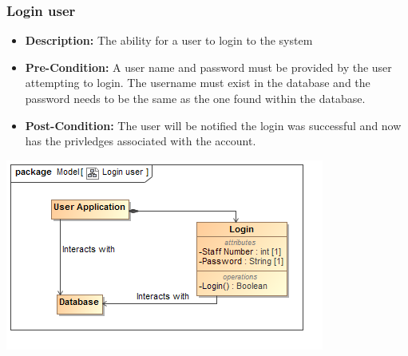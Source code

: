 \documentclass[11pt]{article}
\begin{document}
		\subsubsection{Login user}
		\begin{itemize}
			\item \textbf{Description: }The ability for a user to login to the system
			\item \textbf{Pre-Condition: }A user name and password must be provided by the user attempting to login. The username must exist in the database and the password needs to be the same as the one found within the database. 
			\item \textbf{Post-Condition: }The user will be notified the login was successful and now has the privledges associated with the account.
		\end{itemize}
		\begin{center}
			\includegraphics[width=\textwidth]{../Diagrams/DomainModel/Loginuser.png}\\[0.5cm]
		\end{center}
		\newpage
\end{document}
